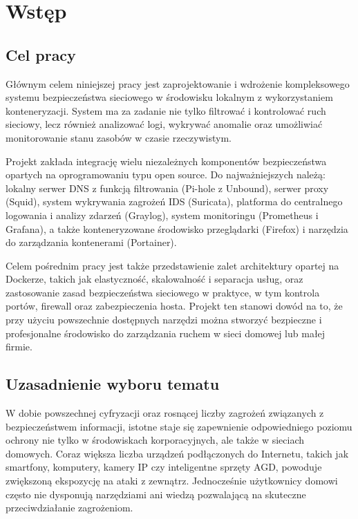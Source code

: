 \documentclass[
    left=2.5cm,         %
    right=2.5cm,        %
    top=2.5cm,          %
    bottom=3cm,         %
    bindingoffset=6mm,  %
    nohyphenation=true %
]{eiti/eiti-thesis} %
\begin{document}
\thispagestyle{empty}
\tableofcontents

\newpage 
\section{Wstęp}
\subsection{Cel pracy}

Głównym celem niniejszej pracy jest zaprojektowanie i wdrożenie kompleksowego systemu bezpieczeństwa sieciowego w środowisku lokalnym z wykorzystaniem konteneryzacji. System ma za zadanie nie tylko filtrować i kontrolować ruch sieciowy, lecz również analizować logi, wykrywać anomalie oraz umożliwiać monitorowanie stanu zasobów w czasie rzeczywistym.

Projekt zakłada integrację wielu niezależnych komponentów bezpieczeństwa opartych na oprogramowaniu typu open source. Do najważniejszych należą: lokalny serwer DNS z funkcją filtrowania (Pi-hole z Unbound), serwer proxy (Squid), system wykrywania zagrożeń IDS (Suricata), platforma do centralnego logowania i analizy zdarzeń (Graylog), system monitoringu (Prometheus i Grafana), a także konteneryzowane środowisko przeglądarki (Firefox) i narzędzia do zarządzania kontenerami (Portainer).

Celem pośrednim pracy jest także przedstawienie zalet architektury opartej na Dockerze, takich jak elastyczność, skalowalność i separacja usług, oraz zastosowanie zasad bezpieczeństwa sieciowego w praktyce, w tym kontrola portów, firewall oraz zabezpieczenia hosta. Projekt ten stanowi dowód na to, że przy użyciu powszechnie dostępnych narzędzi można stworzyć bezpieczne i profesjonalne środowisko do zarządzania ruchem w sieci domowej lub małej firmie.

\subsection{Uzasadnienie wyboru tematu}

W dobie powszechnej cyfryzacji oraz rosnącej liczby zagrożeń związanych z bezpieczeństwem informacji, istotne staje się zapewnienie odpowiedniego poziomu ochrony nie tylko w środowiskach korporacyjnych, ale także w sieciach domowych. Coraz większa liczba urządzeń podłączonych do Internetu, takich jak smartfony, komputery, kamery IP czy inteligentne sprzęty AGD, powoduje zwiększoną ekspozycję na ataki z zewnątrz. Jednocześnie użytkownicy domowi często nie dysponują narzędziami ani wiedzą pozwalającą na skuteczne przeciwdziałanie zagrożeniom.
\end{document}

